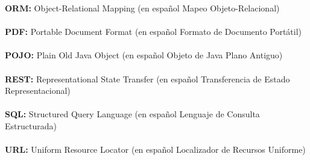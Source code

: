 \textbf{ORM:} Object-Relational Mapping (en español Mapeo Objeto-Relacional)\\ \\
\textbf{PDF:} Portable Document Format (en español Formato de Documento Portátil)\\ \\
\textbf{POJO:} Plain Old Java Object (en español Objeto de Java Plano Antiguo)\\ \\
\textbf{REST:} Representational State Transfer (en español Transferencia de Estado Representacional)\\ \\
\textbf{SQL:} Structured Query Language (en español Lenguaje de Consulta Estructurada)\\ \\
\textbf{URL:} Uniform Resource Locator (en español Localizador de Recursos Uniforme)